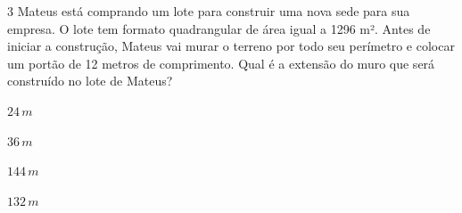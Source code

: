 
\num{3} Mateus está comprando um lote para construir uma nova sede para sua
empresa. O lote tem formato quadrangular de área igual a 1296 m². Antes
de iniciar a construção, Mateus vai murar o terreno por todo seu
perímetro e colocar um portão de 12 metros de comprimento. Qual é a
extensão do muro que será construído no lote de Mateus?
\begin{multicols}{2}
\begin{escolha}[itemsep=0pt]
  \item $24\,m$
  \item $36\,m$
  \item $144\,m$
  \item $132\,m$ 
\end{escolha}
\end{multicols}



